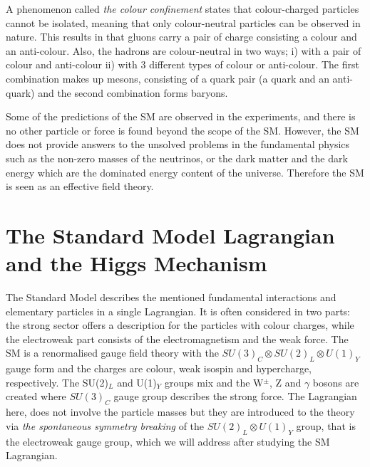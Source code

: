 A phenomenon called \emph{the colour confinement} states that colour-charged particles cannot be isolated, meaning that only colour-neutral particles can be observed in nature\footnotemark. This results in that gluons carry a pair of charge consisting a colour and an anti-colour. Also, the hadrons are colour-neutral in two ways; i) with a pair of colour and anti-colour ii) with 3 different types of colour or anti-colour. The first combination makes up mesons, consisting of a quark pair (a quark and an anti-quark) and the second combination forms baryons.


Some of the predictions of the SM are observed in the experiments, and there is no other particle or force is found beyond the scope of the SM. However, the SM does not provide answers to the unsolved problems in the fundamental physics such as the non-zero masses of the neutrinos\cite{neutrino-mass}, or the dark matter and the dark energy\cite{PlanckCol} which are the dominated energy content of the universe. Therefore the SM is seen as an effective field theory.

\section{The Standard Model Lagrangian and the Higgs Mechanism}
\label{theSMandHiggs}

The Standard Model describes the mentioned fundamental interactions and elementary particles in a single Lagrangian. It is often considered in two parts: the strong sector offers a description for the particles with colour charges, while the electroweak part consists of the electromagnetism and the weak force. The SM is a renormalised gauge field theory with the $ SU(3)_C \otimes SU(2)_L \otimes U(1)_Y$ gauge form and the charges are colour, weak isospin and hypercharge, respectively. The SU(2)$_L$ and U(1)$_Y$ groups mix and the W$^{\pm}$, Z and $\gamma$ bosons are created where $SU(3)_C$ gauge group describes the strong force. The Lagrangian here, does not involve the particle masses but they are introduced to the theory via \emph{the spontaneous symmetry breaking} of the $SU(2)_L \otimes U(1)_Y$ group, that is the electroweak gauge group, which we will address after studying the SM Lagrangian.

